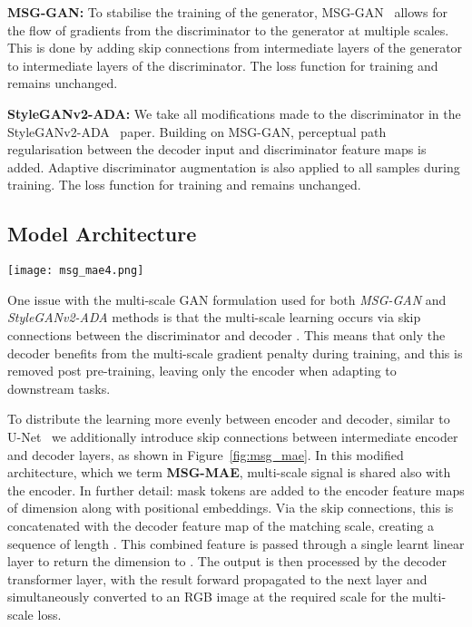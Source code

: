 \documentclass[10pt,twocolumn,letterpaper, cta-author]{article}
\begin{document}
\textbf{MSG-GAN: } To stabilise the training of the generator, MSG-GAN~\cite{karnewar2019msg} allows for the flow of gradients from the discriminator to the generator at multiple scales. This is done by adding skip connections from intermediate layers of the generator to intermediate layers of the discriminator. The loss function for training  and  remains unchanged.

\textbf{StyleGANv2-ADA: } We take all modifications made to the discriminator in the StyleGANv2-ADA~\cite{Karras2020ada} paper. Building on MSG-GAN, perceptual path regularisation between the decoder input and discriminator feature maps is added. Adaptive discriminator augmentation is also applied to all samples during training. The loss function for training  and  remains unchanged.

\subsection{Model Architecture}
\label{msg_mae_model}

\begin{figure*}[t]
    \centering
    \texttt{[image: msg\_mae4.png]}
    \caption{The Multi-Scale Gradient MAE (\textit{MSG-MAE}) architecture. Dotted lines denote skip connections and solid forward propagation.}
    \label{fig:msg_mae}
\end{figure*}

One issue with the multi-scale GAN formulation used for both \textit{MSG-GAN} and \textit{StyleGANv2-ADA} methods is that the multi-scale learning occurs via skip connections between the discriminator  and decoder . This means that only the decoder benefits from the multi-scale gradient penalty during training, and this is removed post pre-training, leaving only the encoder when adapting to downstream tasks.

To distribute the learning more evenly between encoder and decoder, similar to U-Net~\cite{RFB15a} we additionally introduce skip connections between intermediate encoder and decoder layers, as shown in Figure~\ref{fig:msg_mae}. In this modified architecture, which we term \textbf{MSG-MAE}, multi-scale signal is shared also with the encoder.
In further detail: mask tokens are added to the encoder feature maps of dimension  along with positional embeddings. Via the skip connections, this is concatenated with the decoder feature map of the matching scale, creating a sequence of length . This combined feature is passed through a single learnt linear layer to return the dimension to . The output is then processed by the decoder transformer layer, with the result forward propagated to the next layer and simultaneously converted to an RGB image at the required scale for the multi-scale loss.
\end{document}
